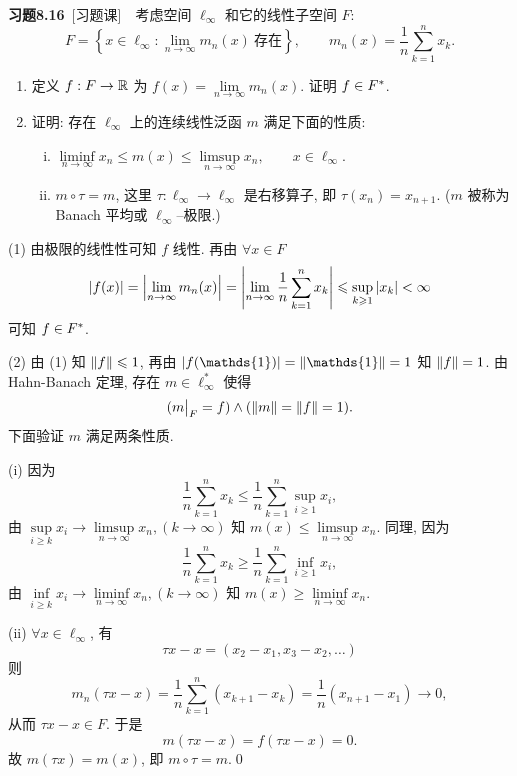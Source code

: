 	\textbf{习题8.16}\ [习题课]\ \ 考虑空间 $ \ell_{\infty} $ 和它的线性子空间 $ F $:
	\[
		F = \left\{ x\in\ell_{\infty}:\lim_{n\to\infty} m_{n}(x)\ \text{存在} \right\}, \qquad m_{n}(x)=\frac{1}{n}\sum_{k=1}^{n} x_{k}.
	\]
	\begin{enumerate}[(1)]
		\item 定义 $ f:F\to\mathbb{R} $ 为 $ f(x)=\lim\limits_{n\to\infty}m_{n}(x) $. 证明 $ f\in F^{*} $.
		\item 证明: 存在 $ \ell_{\infty} $ 上的连续线性泛函 $ m $ 满足下面的性质:
		\begin{enumerate}[(i)]
			\item $ \liminf\limits_{n\to\infty}x_{n}\leqslant m(x)\leqslant\limsup\limits_{n\to\infty}x_{n}, \qquad x\in\ell_{\infty} $.
			\item $ m\circ \tau=m $, 这里 $ \tau: \ell_{\infty}\to\ell_{\infty} $ 是右移算子, 即 $ \tau(x_{n})=x_{n+1} $. ($ m $ 被称为 Banach 平均或 $ \ell_{\infty} $--极限.)
		\end{enumerate}
	\end{enumerate}
	\begin{Proof}
		(1) 由极限的线性性可知 $ f $ 线性. 再由 $ \forall x\in F $
		\[
			\left| f(x) \right| =\left| \lim_{n\to\infty}m_{n}(x) \right| =\left| \lim_{n\to\infty}\frac{1}{n}\sum_{k=1}^{n}x_{k} \right| \leqslant \sup_{k\geqslant1}\left| x_{k} \right| <\infty
		\]
		可知 $ f\in F^{*} $.

		(2)  由 (1) 知 $ \left\| f \right\|\leqslant1 $, 再由 $ \abs{f(\mathds{1})}=\norm{\mathds{1}}=1 $ 知 $ \left\| f \right\|=1 $. 由 Hahn-Banach 定理, 存在 $ m\in\ell_{\infty}^{*} $ 使得
		\[
			(m\big|_{F}=f)\land(\left\| m \right\|=\left\| f \right\|=1).
		\]
		下面验证 $ m $ 满足两条性质.

		(i) 因为
		\[
			\frac{1}{n}\sum_{k=1}^{n}x_{k}\leqslant\frac{1}{n}\sum_{k=1}^{n}\sup_{i\geqslant1}x_{i},
		\]
		由 $ \sup\limits_{i\geqslant k}x_{i}\to\limsup\limits_{n\to\infty}x_{n}, (k\to\infty) $ 知 $ m(x)\leqslant\limsup\limits_{n\to\infty}x_{n} $. 同理, 因为
		\[
			\frac{1}{n}\sum_{k=1}^{n}x_{k}\geqslant\frac{1}{n}\sum_{k=1}^{n}\inf_{i\geqslant1}x_{i},
		\]
		由 $ \inf\limits_{i\geqslant k}x_{i}\to\liminf\limits_{n\to\infty}x_{n}, (k\to\infty) $ 知 $ m(x)\geqslant\liminf\limits_{n\to\infty}x_{n} $.

		(ii) $ \forall x\in\ell_{\infty} $, 有
		\[
			\tau x-x=(x_{2}-x_{1}, x_{3}-x_{2}, \dots)
		\]
		则
		\[ 
			m_{n}(\tau x-x)=\frac{1}{n}\sum_{k=1}^{n}(x_{k+1}-x_{k})=\frac{1}{n}(x_{n+1}-x_{1})\to 0 ,
		\]
		从而 $ \tau x-x\in F $. 于是
		\[
			m(\tau x-x)=f(\tau x-x)=0.
		\]
		故 $ m(\tau x)=m(x) $, 即 $ m\circ \tau =m $.\qed
	\end{Proof}	

